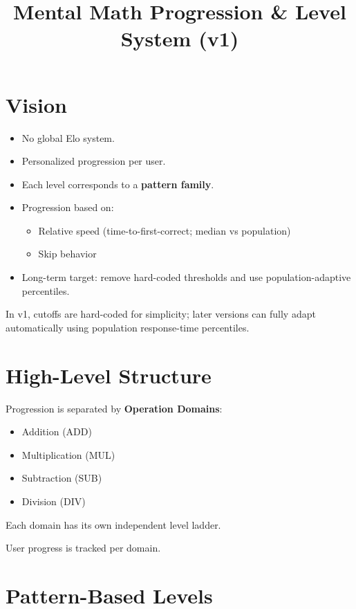 \documentclass[11pt]{article}
\title{Mental Math Progression \& Level System (v1)}
\date{}
\begin{document}
\maketitle

\section{Vision}

\begin{itemize}[leftmargin=*]
    \item No global Elo system.
    \item Personalized progression per user.
    \item Each level corresponds to a \textbf{pattern family}.
    \item Progression based on:
    \begin{itemize}
        \item Relative speed (time-to-first-correct; median vs population)
        \item Skip behavior
    \end{itemize}
    \item Long-term target: remove hard-coded thresholds and use population-adaptive percentiles.
\end{itemize}

In v1, cutoffs are hard-coded for simplicity; later versions can fully adapt automatically using population response-time percentiles.

\section{High-Level Structure}

Progression is separated by \textbf{Operation Domains}:

\begin{itemize}[leftmargin=*]
    \item Addition (ADD)
    \item Multiplication (MUL)
    \item Subtraction (SUB)
    \item Division (DIV)
\end{itemize}

Each domain has its own independent level ladder.

User progress is tracked per domain.

\section{Pattern-Based Levels}
\end{document}
